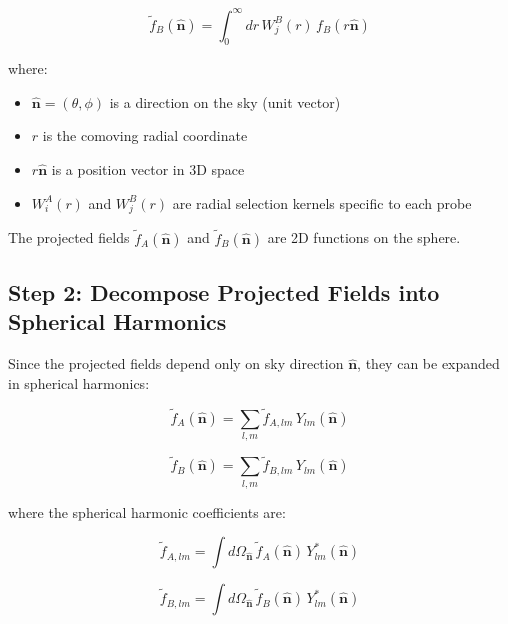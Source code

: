 \begin{equation}
    \tilde{f}_B(\hat{\mathbf{n}}) = \int_0^{\infty} dr \, W_j^B(r) \, f_B(r \hat{\mathbf{n}})
\label{eq:proj_field_B}
\end{equation}

where:
\begin{itemize}
    \item $\hat{\mathbf{n}} = (\theta, \phi)$ is a direction on the sky (unit vector)
    \item $r$ is the comoving radial coordinate
    \item $r\hat{\mathbf{n}}$ is a position vector in 3D space
    \item $W_i^A(r)$ and $W_j^B(r)$ are radial selection kernels specific to each probe
\end{itemize}

The projected fields $\tilde{f}_A(\hat{\mathbf{n}})$ and $\tilde{f}_B(\hat{\mathbf{n}})$ are 2D functions on the sphere.

\subsection{Step 2: Decompose Projected Fields into Spherical Harmonics}

Since the projected fields depend only on sky direction $\hat{\mathbf{n}}$, they can be expanded in spherical harmonics:

\begin{equation}
    \tilde{f}_A(\hat{\mathbf{n}}) = \sum_{l,m} \tilde{f}_{A,lm} \, Y_{lm}(\hat{\mathbf{n}})
\label{eq:sh_decomp_A}
\end{equation}

\begin{equation}
    \tilde{f}_B(\hat{\mathbf{n}}) = \sum_{l,m} \tilde{f}_{B,lm} \, Y_{lm}(\hat{\mathbf{n}})
\label{eq:sh_decomp_B}
\end{equation}

where the spherical harmonic coefficients are:

\begin{equation}
    \tilde{f}_{A,lm} = \int d\Omega_{\hat{\mathbf{n}}} \, \tilde{f}_A(\hat{\mathbf{n}}) \, Y_{lm}^*(\hat{\mathbf{n}})
\label{eq:sh_coeff_A}
\end{equation}

\begin{equation}
    \tilde{f}_{B,lm} = \int d\Omega_{\hat{\mathbf{n}}} \, \tilde{f}_B(\hat{\mathbf{n}}) \, Y_{lm}^*(\hat{\mathbf{n}})
\label{eq:sh_coeff_B}
\end{equation}

